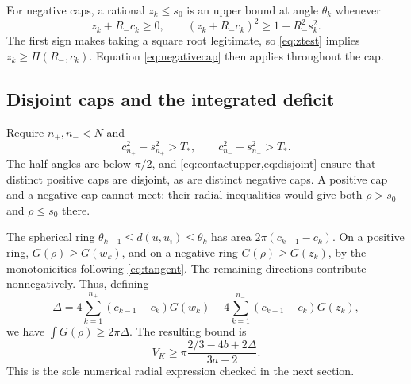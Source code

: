 \documentclass[11pt]{article}
\numberwithin{equation}{section}
\theoremstyle{definition}\newtheorem{definition}[theorem]{Definition}
\theoremstyle{remark}\newtheorem{remark}[theorem]{Remark}
\begin{document}
For negative caps, a rational $z_k\le s_0$ is an upper bound at angle
$\theta_k$ whenever
\begin{equation}\label{eq:ztest}
 z_k+R_-c_k\ge0,\qquad
 (z_k+R_-c_k)^2\ge1-R_-^2s_k^2.
\end{equation}
The first sign makes taking a square root legitimate, so \cref{eq:ztest}
implies $z_k\ge\Pi(R_-,c_k)$. Equation \cref{eq:negativecap} then applies
throughout the cap.

\subsection{Disjoint caps and the integrated deficit}
Require $n_+,n_-<N$ and
\begin{equation}\label{eq:disjoint}
 c_{n_+}^2-s_{n_+}^2>T_*,\qquad
 c_{n_-}^2-s_{n_-}^2>T_*.
\end{equation}
The half-angles are below $\pi/2$, and \cref{eq:contactupper,eq:disjoint}
ensure that distinct positive caps are disjoint, as are distinct negative
caps. A positive cap and a negative cap cannot meet: their radial inequalities
would give both $\rho>s_0$ and $\rho\le s_0$ there.

The spherical ring $\theta_{k-1}\le d(u,u_i)\le\theta_k$ has area
$2\pi(c_{k-1}-c_k)$. On a positive ring,
$G(\rho)\ge G(w_k)$, and on a negative ring $G(\rho)\ge G(z_k)$, by the
monotonicities following \cref{eq:tangent}. The remaining directions
contribute nonnegatively. Thus, defining
\[
 \Delta=4\sum_{k=1}^{n_+}(c_{k-1}-c_k)G(w_k)
       +4\sum_{k=1}^{n_-}(c_{k-1}-c_k)G(z_k),
\]
we have $\int G(\rho)\ge2\pi\Delta$. The resulting bound is
\begin{equation}\label{eq:capfinal}
 \boxed{V_K\ge\pi\frac{2/3-4b+2\Delta}{3a-2}.}
\end{equation}
This is the sole numerical radial expression checked in the next section.
\end{document}

